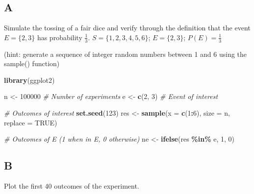 \documentclass[
]{article}
\newenvironment{Shaded}{\begin{snugshade}}{\end{snugshade}}
\newcommand{\AttributeTok}[1]{\textcolor[rgb]{0.13,0.29,0.53}{#1}}
\newcommand{\CommentTok}[1]{\textcolor[rgb]{0.56,0.35,0.01}{\textit{#1}}}
\newcommand{\ConstantTok}[1]{\textcolor[rgb]{0.56,0.35,0.01}{#1}}
\newcommand{\DecValTok}[1]{\textcolor[rgb]{0.00,0.00,0.81}{#1}}
\newcommand{\FunctionTok}[1]{\textcolor[rgb]{0.13,0.29,0.53}{\textbf{#1}}}
\newcommand{\NormalTok}[1]{#1}
\newcommand{\OtherTok}[1]{\textcolor[rgb]{0.56,0.35,0.01}{#1}}
\newcommand{\SpecialCharTok}[1]{\textcolor[rgb]{0.81,0.36,0.00}{\textbf{#1}}}
\begin{document}
\hypertarget{a-1}{%
\subsection{A}\label{a-1}}

Simulate the tossing of a fair dice and verify through the definition
that the event \(E = \{ 2,3 \}\) has probability \(\frac{1}{3}\).
\(S = \{ 1,2,3,4,5,6 \}\); \(E = \{ 2,3 \}\); \(P(E) = \frac{1}{3}\)

(hint: generate a sequence of integer random numbers between 1 and 6
using the sample() function)

\begin{Shaded}
\begin{Highlighting}[]
\FunctionTok{library}\NormalTok{(ggplot2)}

\NormalTok{n }\OtherTok{\textless{}{-}} \DecValTok{100000} \CommentTok{\# Number of experiments}
\NormalTok{e }\OtherTok{\textless{}{-}} \FunctionTok{c}\NormalTok{(}\DecValTok{2}\NormalTok{, }\DecValTok{3}\NormalTok{) }\CommentTok{\# Event of interest}

\CommentTok{\# Outcomes of interest}
\FunctionTok{set.seed}\NormalTok{(}\DecValTok{123}\NormalTok{)}
\NormalTok{res }\OtherTok{\textless{}{-}} \FunctionTok{sample}\NormalTok{(}\AttributeTok{x =} \FunctionTok{c}\NormalTok{(}\DecValTok{1}\SpecialCharTok{:}\DecValTok{6}\NormalTok{), }\AttributeTok{size =}\NormalTok{ n, }\AttributeTok{replace =} \ConstantTok{TRUE}\NormalTok{)}

\CommentTok{\# Outcomes of E (1 when in E, 0 otherwise)}
\NormalTok{ne }\OtherTok{\textless{}{-}} \FunctionTok{ifelse}\NormalTok{(res }\SpecialCharTok{\%in\%}\NormalTok{ e, }\DecValTok{1}\NormalTok{, }\DecValTok{0}\NormalTok{)}
\end{Highlighting}
\end{Shaded}

\hypertarget{b-1}{%
\subsection{B}\label{b-1}}

Plot the first 40 outcomes of the experiment.
\end{document}
